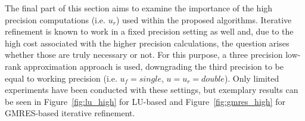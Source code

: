 The final part of this section aims to examine the importance of the high precision computations (i.e. $u_r$) used within the proposed algorithms. Iterative refinement is known to work in a fixed precision setting \cite{skeel_iterative_1980} as well and, due to the high cost associated with the higher precision calculations, the question arises whether those are truly necessary or not. For this purpose, a three precision low-rank approximation approach is used, downgrading the third precision to be equal to working precision (i.e. $u_f = single$, $u=u_r=double$). Only limited experiments have been conducted with these settings, but exemplary results can be seen in Figure~\hyperref[fig:lu_high]{\ref{fig:lu_high}} for LU-based and Figure~\hyperref[fig:gmres_high]{\ref{fig:gmres_high}} for GMRES-based iterative refinement.

